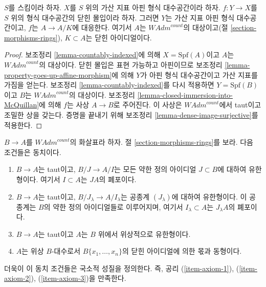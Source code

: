 \begin{lemma}
\label{lemma-closed-immersion-into-countably-indexed}
$S$를 스킴이라 하자. $X$를 $S$ 위의 가산 지표 아핀 형식
대수공간이라 하자. $f : Y \to X$를 $S$ 위의 형식 대수공간의
닫힌 몰입이라 하자. 그러면 $Y$는 가산 지표 아핀 형식 대수공간이고,
$f$는 $A \to A/K$에 대응한다. 여기서 $A$는
$\textit{WAdm}^{count}$의 대상이고(절 \ref{section-morphisms-rings}),
$K \subset A$는 닫힌 아이디얼이다.
\end{lemma}

\begin{proof}
보조정리 \ref{lemma-countably-indexed}에 의해
$X = \text{Spf}(A)$이고 $A$는 $\textit{WAdm}^{count}$의 대상이다.
닫힌 몰입은 표현 가능하고 아핀이므로 보조정리
\ref{lemma-property-goes-up-affine-morphism}에 의해 $Y$가 아핀 형식
대수공간이고 가산 지표를 가짐을 얻는다. %
보조정리 \ref{lemma-countably-indexed}를 다시 적용하면
$Y = \text{Spf}(B)$이고 $B$는 $\textit{WAdm}^{count}$의 대상이다.
보조정리 \ref{lemma-closed-immersion-into-McQuillan}에 의해 $f$는
사상 $A \to B$로 주어진다. 이 사상은 $\textit{WAdm}^{count}$에서
taut이고 조밀한 상을 갖는다. 증명을 끝내기 위해 보조정리
\ref{lemma-dense-image-surjective}를 적용한다.
\end{proof}

\begin{lemma}
\label{lemma-quotient-restricted-power-series}
$B \to A$를 $\textit{WAdm}^{count}$의 화살표라 하자. 절
\ref{section-morphisms-rings}를 보라. 다음 조건들은 동치이다.
\begin{enumerate}
\item[(a)] $B \to A$는 taut이고, $B/J \to A/I$는 모든 약한 정의 아이디얼
$J \subset B$에 대하여 유한형이다. 여기서
$I \subset A$는 $JA$의 폐포이다.
\item[(b)] $B \to A$는 taut이고, $B/J_\lambda \to A/I_\lambda$는
공종계 $(J_\lambda)$에 대하여 유한형이다. 이 공종계는 $B$의 약한
정의 아이디얼들로 이루어지며, 여기서 $I_\lambda \subset A$는
$J_\lambda A$의 폐포이다.
\item[(c)] $B \to A$는 taut이고 $A$는 $B$ 위에서 위상적으로 유한형이다.
\item[(d)] $A$는 위상 $B$-대수로서 $B\{x_1, \ldots, x_n\}$의 닫힌
아이디얼에 의한 몫과 동형이다.
\end{enumerate}
더욱이 이 동치 조건들은 국소적 성질을 정의한다. 즉, 공리
(\ref{item-axiom-1}), (\ref{item-axiom-2}), (\ref{item-axiom-3})을
만족한다.
\end{lemma}

